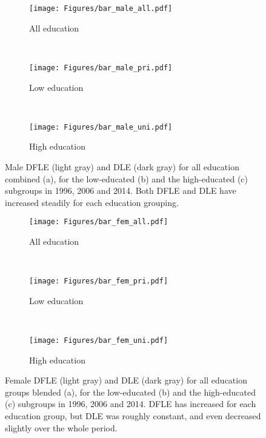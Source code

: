 \begin{figure}[ht!]
    \centering
    \begin{subfigure}[b]{0.2\textwidth}
        \texttt{[image: Figures/bar\_male\_all.pdf]}
        \caption{All education}
        \label{fig:barsmalesa}
    \end{subfigure}
    ~ %
    \begin{subfigure}[b]{0.2\textwidth}
        \texttt{[image: Figures/bar\_male\_pri.pdf]}
        \caption{Low education}
    \end{subfigure}
    ~ %
    \begin{subfigure}[b]{0.2\textwidth}
        \texttt{[image: Figures/bar\_male\_uni.pdf]}
        \caption{High education}
    \end{subfigure}
    \caption{Male DFLE (light gray) and DLE (dark gray) for all education combined (a), for the low-educated (b) and the high-educated (c) subgroups in 1996, 2006 and 2014. Both DFLE and DLE have increased steadily for each education grouping.}\label{fig:barsmales}
\end{figure}

\begin{figure}[ht!]
    \centering
    \begin{subfigure}[b]{0.2\textwidth}
        \texttt{[image: Figures/bar\_fem\_all.pdf]}
        \caption{All education}
        \label{fig:barsfemalesa}
    \end{subfigure}
    ~ %
    \begin{subfigure}[b]{0.2\textwidth}
        \texttt{[image: Figures/bar\_fem\_pri.pdf]}
        \caption{Low education}
    \end{subfigure}
    ~ %
    \begin{subfigure}[b]{0.2\textwidth}
        \texttt{[image: Figures/bar\_fem\_uni.pdf]}
        \caption{High education}
        \label{fig:barsfemalesc}
    \end{subfigure}
    \caption{Female DFLE (light gray) and DLE (dark gray) for all education groups blended (a), for the low-educated (b) and the high-educated (c) subgroups in 1996, 2006 and 2014. DFLE has increased for each education group, but DLE was roughly constant, and even decreased slightly over the whole period.}\label{fig:barsfemales}
\end{figure}

